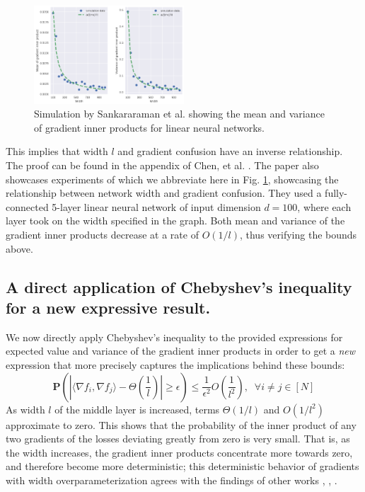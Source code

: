 \documentclass{article}
\begin{document}
\begin{figure}[h]
	\centering
    \includegraphics[width=0.5\textwidth]{pics/overparameterization/grad_inner_prod_exp_var.png}
	\caption{Simulation by Sankararaman et al. \cite{gradient_confusion} showing the mean and variance of gradient inner products for linear neural networks.}
	\label{fig:mean_inner_prod}
\end{figure}

This implies that width $l$ and gradient confusion have an inverse relationship. The proof can be found in the appendix of Chen, et al. \cite{chen}. The paper also showcases experiments of which we abbreviate here in Fig. \ref{fig:mean_inner_prod}, showcasing the relationship between network width and gradient confusion. They used a fully-connected 5-layer linear neural network of input dimension $d = 100$, where each layer took on the width specified in the graph. Both mean and variance of the gradient inner products decrease at a rate of $O(1/l)$, thus verifying the bounds above.

\subsection{A direct application of Chebyshev's inequality for a new expressive result.}
We now directly apply Chebyshev's inequality to the provided expressions for expected value and variance of the gradient inner products in order to get a \textit{new} expression that more precisely captures the implications behind these bounds:
$$\boxed{\mathbf{P}\left( \left\lvert \langle \nabla f_i, \nabla f_j \rangle - \Theta(\frac{1}{l}) \right\rvert \geq \epsilon  \right) \leq \frac{1}{\epsilon^2}O(\frac{1}{l^2}), \;\; \forall i \not = j \in [N]}$$
As width $l$ of the middle layer is increased, terms $\Theta(1/l)$ and $O(1/l^2)$ approximate to zero. This shows that the probability of the inner product of any two gradients of the losses deviating greatly from zero is very small. That is, as the width increases, the gradient inner products concentrate more towards zero, and therefore become more deterministic; this deterministic behavior of gradients with width overparameterization agrees with the findings of other works \cite{oymak}, \cite{bassily}, \cite{SimonDu}.\\
\end{document}
